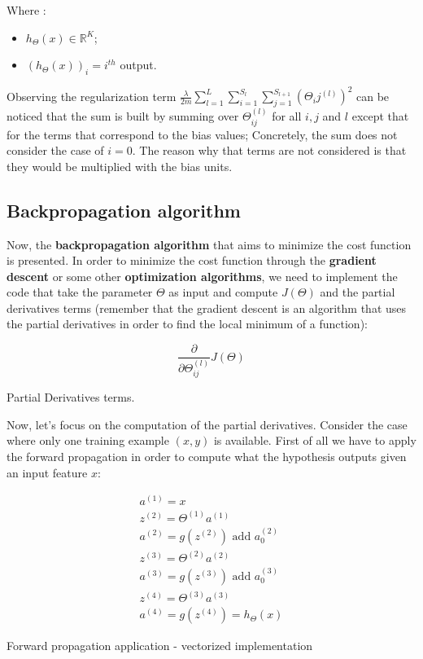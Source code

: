Where :
\begin{itemize}
		\item $h_\Theta(x) \in \mathbb{R}^K$;
		\item $(h_\Theta(x))_i = i^{th}$ output.
	\end{itemize}
	
Observing the regularization term 
$\frac{\lambda}{2m} 
\sum_{l=1}^{L} 
\sum_{i=1}^{S_l} 
\sum_{j=1}^{S_{l+1}} (\Theta_ij^{(l)})^2$	
can be noticed that the sum is built by summing over $\Theta_{ij}^{(l)}$ for all $i,j$ and $l$ except that for the terms that correspond to the bias values; Concretely, the sum does not consider the case of $i=0$. The reason why that terms are not considered is that they would be multiplied with the bias units.


\subsection{Backpropagation algorithm}
Now, the {\bf backpropagation algorithm} that aims to minimize the cost function is presented. In order to minimize the cost function through the {\bf gradient descent} or some other {\bf optimization algorithms}, we need to implement the code that take the parameter $\Theta$ as input and compute $J(\Theta)$ and the partial derivatives terms (remember that the gradient descent is an algorithm that uses the partial derivatives in order to find the local minimum of a function):


\begin{eqfloat}[H]
\begin{equation}
\frac{\partial}{\partial \Theta_{ij}^{(l)}} J(\Theta)
\end{equation}
      \addtocounter{equation}{-1}
        \caption{ Partial Derivatives terms.}
        \label{eq:partderiv}
    \end{eqfloat}


Now, let's focus on the computation of the partial derivatives. Consider the case where only one training example $(x,y)$ is available. First of all we have to apply the forward propagation in order to compute what the hypothesis outputs given an input feature $x$:

\begin{eqfloat}[H]
\begin{equation}
	\begin{aligned}
	a^{(1)}  = x \\
	z^{(2)}  = \Theta^{(1)}a^{(1)} \\
	a^{(2)}  = g(z^{(2)}) \text{ add }  a_0^{(2)} \\
	z^{(3)}  = \Theta^{(2)}a^{(2)} \\
	a^{(3)}  = g(z^{(3)}) \text{ add }  a_0^{(3)} \\
	z^{(4)}  = \Theta^{(3)}a^{(3)} \\
	a^{(4)}  = g(z^{(4)}) = h_\Theta(x)
	\end{aligned}	
\end{equation}
      \addtocounter{equation}{-1}
        \caption{ Forward propagation application - vectorized implementation}
        \label{eq:forwprop}
    \end{eqfloat}


